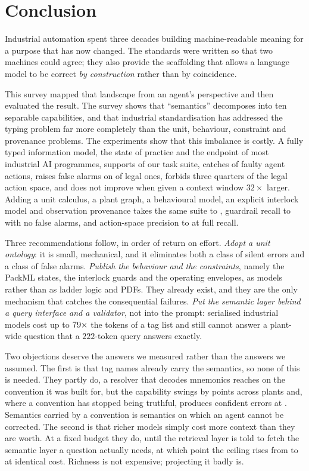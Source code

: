 \section{Conclusion}
\label{sec:conclusion}

Industrial automation spent three decades building machine-readable meaning for
a purpose that has now changed. The standards were written so that two machines
could agree; they also provide the scaffolding that allows a language model to be
correct \emph{by construction} rather than by coincidence.

This survey mapped that landscape from an agent's perspective and then evaluated
the result. The survey shows that ``semantics'' decomposes into ten separable
capabilities, and that industrial standardisation has addressed the typing problem
far more completely than the unit, behaviour, constraint and provenance problems.
The experiments show that this imbalance is costly. A fully typed information
model, the state of
practice and the endpoint of most industrial AI programmes, supports
\CeilingCTwo{} of our task suite, catches \RecallGTwo{} of faulty agent actions,
raises false alarms on \FPRGTwo{} of legal ones, forbids three quarters of the
legal action space, and does not improve when given a context window
$32\times$ larger. Adding a unit calculus, a plant graph, a behavioural model,
an explicit interlock model and observation provenance takes the same suite to
\CeilingCFour{}, guardrail recall to \RecallGFour{} with no false alarms, and
action-space precision to \ActPrecGFour{} at full recall.

Three recommendations follow, in order of return on effort. \emph{Adopt a unit
ontology}: it is small, mechanical, and it eliminates both a class of silent
errors and a class of false alarms. \emph{Publish the behaviour and the
constraints}, namely the PackML states, the interlock guards and the operating envelopes,
as models rather than as ladder logic and PDFs. They already exist, and they
are the only mechanism that catches the consequential failures. \emph{Put the
semantic layer behind a query interface and a validator}, not into the prompt:
serialised
industrial models cost up to $79\times$ the tokens of a tag list and
still cannot answer a plant-wide question that a $222$-token query answers
exactly.

Two objections deserve the answers we measured rather than the answers we
assumed. The first is that tag names already carry the semantics, so none of
this is needed. They partly do, a resolver that decodes mnemonics reaches
\ConvMnemonicDecoded{} on the convention it was built for, but the capability
swings by \ConvSpreadCOnePlusconv{} points across plants and, where a
convention has stopped being truthful, produces confident errors at
\ConvLyingWrong{}. Semantics carried by a convention is semantics on which an
agent cannot be corrected. The second is that richer models simply cost more
context than they are worth. At a fixed budget they do, until the retrieval
layer is told to fetch the semantic layer a question actually needs, at which
point the ceiling rises from \RouteCFourNeighCeiling{} to
\RouteCFourRoutedCeiling{} at identical cost. Richness is not expensive;
projecting it badly is.

